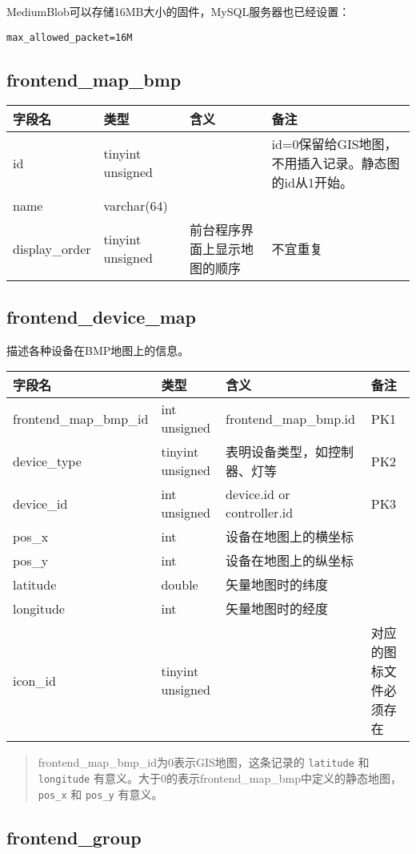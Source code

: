 MediumBlob可以存储16MB大小的固件，MySQL服务器也已经设置：

\texttt{max\_allowed\_packet=16M}

\subsection{frontend\_map\_bmp}\label{frontendux5fmapux5fbmp}

\begin{longtabu}[c]{@{}lXXX@{}}
\toprule
字段名 & 类型 & 含义 & 备注\tabularnewline
\midrule
\endhead
id & tinyint unsigned & &
id=0保留给GIS地图，不用插入记录。静态图的id从1开始。\tabularnewline
name & varchar(64) & &\tabularnewline
display\_order & tinyint unsigned & 前台程序界面上显示地图的顺序 &
不宜重复\tabularnewline
\bottomrule
\end{longtabu}

\subsection{frontend\_device\_map}\label{frontendux5fdeviceux5fmap}

描述各种设备在BMP地图上的信息。

\begin{longtabu}[c]{@{}lXXX@{}}
\toprule
字段名 & 类型 & 含义 & 备注\tabularnewline
\midrule
\endhead
frontend\_map\_bmp\_id & int unsigned & frontend\_map\_bmp.id &
PK1\tabularnewline
device\_type & tinyint unsigned & 表明设备类型，如控制器、灯等 &
PK2\tabularnewline
device\_id & int unsigned & device.id or controller.id &
PK3\tabularnewline
pos\_x & int & 设备在地图上的横坐标 &\tabularnewline
pos\_y & int & 设备在地图上的纵坐标 &\tabularnewline
latitude & double & 矢量地图时的纬度 &\tabularnewline
longitude & int & 矢量地图时的经度 &\tabularnewline
icon\_id & tinyint unsigned & & 对应的图标文件必须存在\tabularnewline
\bottomrule
\end{longtabu}

\begin{quote}
frontend\_map\_bmp\_id为0表示GIS地图，这条记录的 \texttt{latitude} 和
\texttt{longitude}
有意义。大于0的表示frontend\_map\_bmp中定义的静态地图， \texttt{pos\_x}
和 \texttt{pos\_y} 有意义。
\end{quote}

\subsection{frontend\_group}\label{frontendux5fgroup}

